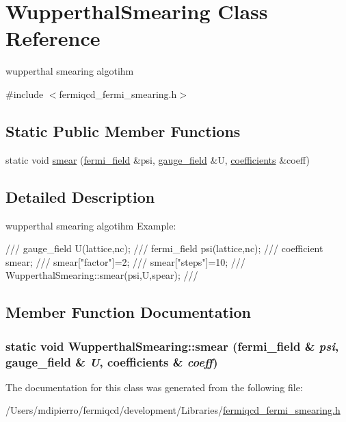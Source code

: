 \hypertarget{class_wupperthal_smearing}{
\section{WupperthalSmearing Class Reference}
\label{class_wupperthal_smearing}
}


wupperthal smearing algotihm  


{\ttfamily \#include $<$fermiqcd\_\-fermi\_\-smearing.h$>$}\subsection*{Static Public Member Functions}
\begin{DoxyCompactItemize}
\item 
static void \hyperlink{class_wupperthal_smearing_a484201d5d7f970d0c8a6a97daf100d78}{smear} (\hyperlink{classfermi__field}{fermi\_\-field} \&psi, \hyperlink{classgauge__field}{gauge\_\-field} \&U, \hyperlink{classcoefficients}{coefficients} \&coeff)
\end{DoxyCompactItemize}


\subsection{Detailed Description}
wupperthal smearing algotihm Example: \begin{DoxyVerb}
/// gauge_field U(lattice,nc);
/// fermi_field psi(lattice,nc);
/// coefficient smear;
/// smear["factor"]=2;
/// smear["steps"]=10;
/// WupperthalSmearing::smear(psi,U,spear);
/// \end{DoxyVerb}
 

\subsection{Member Function Documentation}
\hypertarget{class_wupperthal_smearing_a484201d5d7f970d0c8a6a97daf100d78}{
\subsubsection[{smear}]{\setlength{\rightskip}{0pt plus 5cm}static void WupperthalSmearing::smear ({\bf fermi\_\-field} \& {\em psi}, \/  {\bf gauge\_\-field} \& {\em U}, \/  {\bf coefficients} \& {\em coeff})}}
\label{class_wupperthal_smearing_a484201d5d7f970d0c8a6a97daf100d78}


The documentation for this class was generated from the following file:\begin{DoxyCompactItemize}
\item 
/Users/mdipierro/fermiqcd/development/Libraries/\hyperlink{fermiqcd__fermi__smearing_8h}{fermiqcd\_\-fermi\_\-smearing.h}\end{DoxyCompactItemize}
